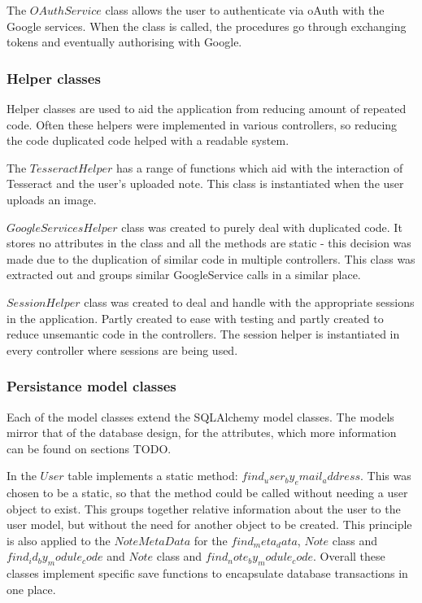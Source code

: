 The $OAuthService$ class allows the user to authenticate via oAuth with the Google services. When the class is called, the procedures go through exchanging tokens and eventually authorising with Google.

\subsubsection{Helper classes}
Helper classes are used to aid the application from reducing amount of repeated code. Often these helpers were implemented in various controllers, so reducing the code duplicated code helped with a readable system.

The $TesseractHelper$ has a range of functions which aid with the interaction of Tesseract and the user's uploaded note. This class is instantiated when the user uploads an image.

$GoogleServicesHelper$ class was created to purely deal with duplicated code. It stores no attributes in the class and all the methods are static - this decision was made due to the duplication of similar code in multiple controllers. This class was extracted out and groups similar GoogleService calls in a similar place.

$SessionHelper$ class was created to deal and handle with the appropriate sessions in the application. Partly created to ease with testing and partly created to reduce unsemantic code in the controllers. The session helper is instantiated in every controller where sessions are being used.


\subsubsection{Persistance model classes}
Each of the model classes extend the SQLAlchemy model classes. The models mirror that of the database design, for the attributes, which more information can be found on sections TODO.

In the $User$ table implements a static method: $find_user_by_email_address$. This was chosen to be a static, so that the method could be called without needing a user object to exist. This groups together relative information about the user to the user model, but without the need for another object to be created. This principle is also applied to the $NoteMetaData$ for the $find_meta_data$, $Note$ class and $find_id_by_module_code$ and $Note$ class and $find_note_by_module_code$. Overall these classes implement specific save functions to encapsulate database transactions in one place.


